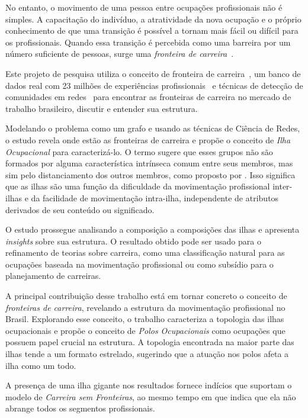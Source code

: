 \documentclass[12pt,a4paper]{article}
\begin{document}
No entanto, o movimento de uma pessoa entre ocupações profissionais não é simples. A capacitação do indivíduo, a atratividade da nova ocupação e o próprio conhecimento de que uma transição é possível a tornam mais fácil ou difícil para os profissionais. Quando essa transição é percebida como uma barreira por um número suficiente de pessoas, surge uma \textit{fronteira de carreira}~\cite{Gunz2007-hr}.

Este projeto de pesquisa utiliza o conceito de fronteira de carreira~\cite{Gunz2007-hr}, um banco de dados real com 23 milhões de experiências profissionais~\cite{VAGAS_Tecnologia2014-yv} e técnicas de detecção de comunidades em redes~\cite{Rosvall2009-sd,Edler2017-kt} para encontrar as fronteiras de carreira no mercado de trabalho brasileiro, discutir e entender sua estrutura.

Modelando o problema como um grafo e usando as técnicas de Ciência de Redes, o estudo revela onde estão as fronteiras de carreira e propõe o conceito de \textit{Ilha Ocupacional} para caracterizá-lo. O termo sugere que esses grupos não são formados por alguma característica intrínseca comum entre seus membros, mas sim pelo distanciamento dos outros membros, como proposto por . Isso significa que as ilhas são uma função da dificuldade da movimentação profissional inter-ilhas e da facilidade de movimentação intra-ilha, independente de atributos derivados de seu conteúdo ou significado.

O estudo prossegue analisando a composição a composições das ilhas e apresenta \textit{insights} sobre sua estrutura. O resultado obtido pode ser usado para o refinamento de teorias sobre carreira, como uma classificação natural para as ocupações baseada na movimentação profissional ou como subsídio para o planejamento de carreiras.

A principal contribuição desse trabalho está em tornar concreto o conceito de \textit{fronteiras de carreira}, revelando a estrutura da movimentação profissional no Brasil. Explorando esse conceito, o trabalho caracteriza a topologia das ilhas ocupacionais e propõe o conceito de \textit{Polos Ocupacionais} como ocupações que possuem papel crucial na estrutura. A topologia encontrada na maior parte das ilhas tende a um formato estrelado, sugerindo que a atuação nos polos afeta a ilha como um todo.

A presença de uma ilha gigante nos resultados fornece indícios que suportam o modelo de \textit{Carreira sem Fronteiras}, ao mesmo tempo em que indica que ela não abrange todos os segmentos profissionais.
\end{document}
